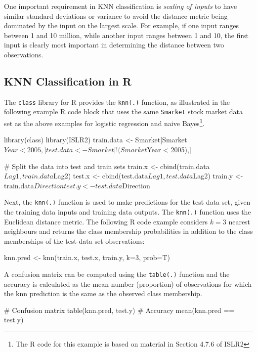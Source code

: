 One important requirement in KNN classification is \emph{scaling of inputs} to have similar standard deviations or variance to avoid the distance metric being dominated by the input on the largest scale. For example, if one input ranges between 1 and 10 million, while another input ranges between 1 and 10, the first input is clearly most important in determining the distance between two observations.

\subsection{KNN Classification in R}

The \texttt{class} library for R provides the \texttt{knn(.)} function, as illustrated in the following example R code block that uses the same \texttt{Smarket} stock market data set as the above examples for logistic regression and naive Bayes\footnote{The R code for this example is based on material in Section 4.7.6 of ISLR2}.

\begin{samepage}
\begin{Rcode}
library(class)
library(ISLR2)
train.data <- Smarket[Smarket$Year < 2005,]
test.data <- Smarket[!(Smarket$Year < 2005),]

# Split the data into test and train sets
train.x <- cbind(train.data$Lag1, train.data$Lag2)
test.x <- cbind(test.data$Lag1, test.data$Lag2)
train.y <- train.data$Direction
test.y <- test.data$Direction
\end{Rcode}
\end{samepage}

Next, the \texttt{knn(.)} function is used to make predictions for the test data set, given the training data inputs and training data outputs. The \texttt{knn(.)} function uses the Euclidean distance metric. The following R code example considers $k=3$ nearest neighbours and returns the class membership probabilities in addition to the class memberships of the test data set observations:

\begin{Rcode}
knn.pred <- knn(train.x, test.x, train.y, k=3, prob=T)
\end{Rcode}

A confusion matrix can be computed using the \texttt{table(.)} function and the accuracy is calculated as the mean number (proportion) of observations for which the knn prediction is the same as the observed class membership.

\begin{samepage}
\begin{Rcode}
# Confusion matrix
table(knn.pred, test.y)
# Accuracy
mean(knn.pred == test.y)
\end{Rcode}
\end{samepage}

